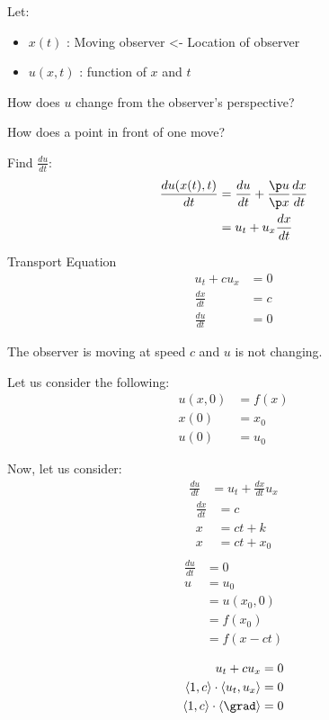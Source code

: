   Let:
  \begin{itemize}
    \item $x(t)$ : Moving observer <- Location of observer
    \item $u(x, t)$ : function of $x$ and $t$
  \end{itemize}

  How does $u$ change from the observer's perspective?

  How does a point in front of one move?

  Find $\frac{du}{dt}$:
  \begin{align}
    \frac{du(x(t), t)}{dt} & = \frac{du}{dt} + \frac{\p u}{\p x} \frac{dx}{dt}\\
    & = u_t + u_x \frac{dx}{dt}
  \end{align}

  \ex Transport Equation
  \begin{align}
    u_t + cu_x & = 0\\
    \frac{dx}{dt} & = c\\
    \frac{du}{dt} & = 0
  \end{align}

  The observer is moving at speed $c$ and $u$ is not changing.

  Let us consider the following:
  \begin{align}
    u(x, 0) & = f(x)\\
    x(0) & = x_0\\
    u(0) & = u_0
  \end{align}

  Now, let us consider:
  \begin{align}
    \frac{du}{dt} & = u_t + \frac{dx}{dt} u_x
  \end{align}
  \begin{align}
    \frac{dx}{dt} & = c\\
    x & = ct + k\\
    x & = ct + x_0\\
  \end{align}
  \begin{align}
    \frac{du}{dt} & = 0\\
    u & = u_0\\ & = u(x_0, 0)\\ & = f(x_0)\\ & = f(x - ct)
  \end{align}

  \note
  \begin{align}
    u_t + cu_x & = 0\\
    \left< 1, c \right> \cdot \left< u_t, u_x \right> & = 0\\
    \left< 1, c \right> \cdot \left< \grad \right> & = 0
  \end{align}


